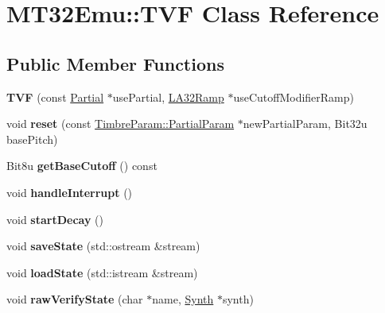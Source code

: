 \hypertarget{classMT32Emu_1_1TVF}{\section{M\-T32\-Emu\-:\-:T\-V\-F Class Reference}
\label{classMT32Emu_1_1TVF}
}
\subsection*{Public Member Functions}
\begin{DoxyCompactItemize}
\item 
\hypertarget{classMT32Emu_1_1TVF_a2c4a757d52d56519d8f77dbfc7b6bfed}{{\bfseries T\-V\-F} (const \hyperlink{classMT32Emu_1_1Partial}{Partial} $\ast$use\-Partial, \hyperlink{classMT32Emu_1_1LA32Ramp}{L\-A32\-Ramp} $\ast$use\-Cutoff\-Modifier\-Ramp)}\label{classMT32Emu_1_1TVF_a2c4a757d52d56519d8f77dbfc7b6bfed}

\item 
\hypertarget{classMT32Emu_1_1TVF_a7fb13b18e739b36d6748395380f8a280}{void {\bfseries reset} (const \hyperlink{structMT32Emu_1_1TimbreParam_1_1PartialParam}{Timbre\-Param\-::\-Partial\-Param} $\ast$new\-Partial\-Param, Bit32u base\-Pitch)}\label{classMT32Emu_1_1TVF_a7fb13b18e739b36d6748395380f8a280}

\item 
\hypertarget{classMT32Emu_1_1TVF_a87bd8d43b8c5a68bc615f98d223ac04d}{Bit8u {\bfseries get\-Base\-Cutoff} () const }\label{classMT32Emu_1_1TVF_a87bd8d43b8c5a68bc615f98d223ac04d}

\item 
\hypertarget{classMT32Emu_1_1TVF_a49cc8c8c2c35935a2f4e7eca3fe39def}{void {\bfseries handle\-Interrupt} ()}\label{classMT32Emu_1_1TVF_a49cc8c8c2c35935a2f4e7eca3fe39def}

\item 
\hypertarget{classMT32Emu_1_1TVF_a1e9c37d4d1d9ce3caf71762ceb8a11db}{void {\bfseries start\-Decay} ()}\label{classMT32Emu_1_1TVF_a1e9c37d4d1d9ce3caf71762ceb8a11db}

\item 
\hypertarget{classMT32Emu_1_1TVF_a77f243afef36245ad479b238427117cf}{void {\bfseries save\-State} (std\-::ostream \&stream)}\label{classMT32Emu_1_1TVF_a77f243afef36245ad479b238427117cf}

\item 
\hypertarget{classMT32Emu_1_1TVF_ad015eb1308dd4cba77ad61fd1af6806f}{void {\bfseries load\-State} (std\-::istream \&stream)}\label{classMT32Emu_1_1TVF_ad015eb1308dd4cba77ad61fd1af6806f}

\item 
\hypertarget{classMT32Emu_1_1TVF_a55a05d98d16a9542112c92ea3747d994}{void {\bfseries raw\-Verify\-State} (char $\ast$name, \hyperlink{classMT32Emu_1_1Synth}{Synth} $\ast$synth)}\label{classMT32Emu_1_1TVF_a55a05d98d16a9542112c92ea3747d994}

\end{DoxyCompactItemize}


